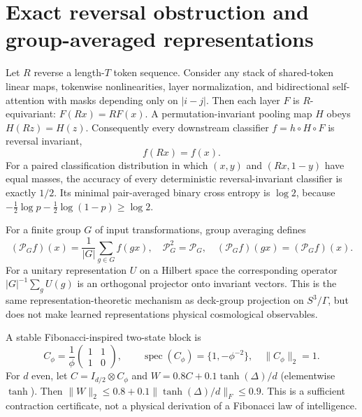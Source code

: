 \section{Exact reversal obstruction and group-averaged representations}
\label{sec:fibonacci_symmetry_obstruction}
Let $R$ reverse a length-$T$ token sequence. Consider any stack of shared-token
linear maps, tokenwise nonlinearities, layer normalization, and bidirectional
self-attention with masks depending only on $|i-j|$. Then each layer $F$
is $R$-equivariant: $F(Rx)=RF(x)$. A permutation-invariant pooling map $H$
obeys $H(Rz)=H(z)$. Consequently every downstream classifier $f=h\circ H\circ F$
is reversal invariant,
\begin{equation}
 f(Rx)=f(x).
\end{equation}
For a paired classification distribution in which $(x,y)$ and $(Rx,1-y)$
have equal masses, the accuracy of every deterministic reversal-invariant
classifier is exactly $1/2$. Its minimal pair-averaged binary cross entropy
is $\log 2$, because $-\tfrac12\log p-\tfrac12\log(1-p)\ge\log2$.

For a finite group $G$ of input transformations, group averaging defines
\begin{equation}
 (\mathcal P_G f)(x)=\frac{1}{|G|}\sum_{g\in G}f(gx),\quad
 \mathcal P_G^2=\mathcal P_G,\quad
 (\mathcal P_G f)(gx)=(\mathcal P_G f)(x).
\end{equation}
For a unitary representation $U$ on a Hilbert space the corresponding
operator $|G|^{-1}\sum_g U(g)$ is an orthogonal projector onto invariant vectors.
This is the same representation-theoretic mechanism as deck-group projection
on $S^3/\Gamma$, but does not make learned representations physical cosmological
observables.

A stable Fibonacci-inspired two-state block is
\begin{equation}
 C_\phi=\frac{1}{\phi}\begin{pmatrix}1&1\\1&0\end{pmatrix},\qquad
 \operatorname{spec}(C_\phi)=\{1,-\phi^{-2}\},\quad\|C_\phi\|_2=1.
\end{equation}
For $d$ even, let $C=I_{d/2}\otimes C_\phi$ and
$W=0.8 C+0.1\tanh(\Delta)/d$ (elementwise $\tanh$). Then
$\|W\|_2\le0.8+0.1\|\tanh(\Delta)/d\|_F\le0.9$.
This is a sufficient contraction certificate, not a physical derivation
of a Fibonacci law of intelligence.
